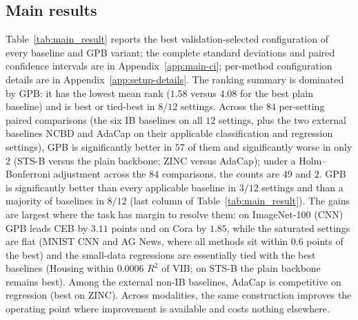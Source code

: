 \subsection{Main results}
\label{sec:main-results}

Table~\ref{tab:main_result} reports the best validation-selected configuration of
every baseline and GPB variant; the complete standard deviations and paired confidence
intervals are in Appendix~\ref{app:main-ci};
per-method configuration details are in Appendix~\ref{app:setup-details}. The ranking summary is dominated by GPB: it has
the lowest mean rank ($1.58$ versus $4.08$ for the best plain
baseline) and is best or tied-best in $8/12$ settings. Across the $84$ per-setting paired comparisons (the six IB baselines on all $12$ settings, plus the two external baselines NCBD and AdaCap on their applicable classification and regression settings), GPB is significantly better in $57$ of them and significantly worse in only $2$ (STS-B versus the plain backbone; ZINC versus AdaCap); under a Holm--Bonferroni adjustment across the $84$ comparisons, the counts are $49$ and $2$. GPB is significantly better than every applicable baseline in $3/12$ settings and than a majority of baselines in $8/12$ (last column of Table~\ref{tab:main_result}). The gains are largest where the task has margin to
resolve them: on ImageNet-100 (CNN) GPB leads CEB by $3.11$ points and on Cora by
$1.85$, while the saturated settings are flat (MNIST CNN and AG News, where all
methods sit within $0.6$ points of the best) and the small-data regressions are
essentially tied with the best baselines (Housing within $0.0006$ $R^2$ of VIB; on
STS-B the plain backbone remains best). Among the external non-IB baselines, AdaCap is
competitive on regression (best on ZINC). Across modalities, the same construction
improves the operating point where improvement is available and costs nothing
elsewhere.

